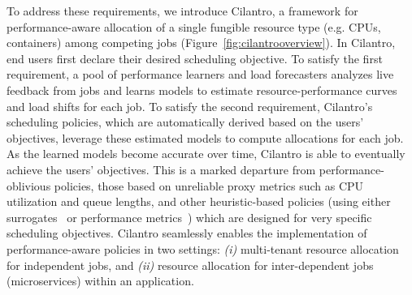 To address these requirements,
we introduce Cilantro, a framework for performance-aware allocation of a single fungible resource type
(e.g. CPUs, containers) among competing jobs (Figure~\ref{fig:cilantrooverview}).
In Cilantro, end users first declare their desired scheduling objective.
To satisfy the first requirement, a pool of performance learners and load forecasters analyzes live feedback from jobs and
learns models to estimate
resource-performance curves and load shifts for each job.
To satisfy the second requirement, Cilantro's scheduling policies, which are automatically derived based on the users' objectives,
leverage these estimated models to compute allocations for each job. 
As the learned models become accurate over time, Cilantro is able to eventually achieve the
users' objectives.
This is a marked departure from performance-oblivious policies,
those based on unreliable proxy metrics such as CPU utilization and queue lengths,
and other heuristic-based policies
(using either surrogates~\cite{rzadca2020autopilot}
or performance metrics~\cite{chen2019parties,jockey})
which are designed for very specific scheduling objectives.
% 
Cilantro seamlessly enables the implementation of performance-aware policies in two settings:
\emph{(i)} multi-tenant resource allocation for independent jobs,
and
\emph{(ii)} resource allocation for inter-dependent jobs (microservices) within an
application.


